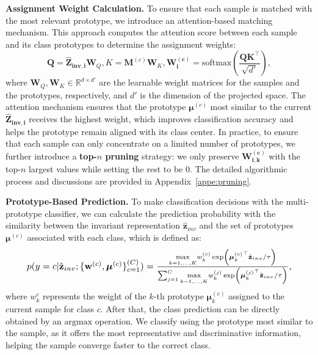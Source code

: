 \noindent\textbf{Assignment Weight Calculation.} 
To ensure that each sample is matched with the most relevant prototype, we introduce an attention-based matching mechanism. This approach computes the attention score between each sample and its class prototypes to determine the assignment weights:
\begin{equation}\label{eq: att}
    \mathbf{Q} = \mathbf{\hat{Z}_{inv,i}}\mathbf{W}_{Q}, K = \mathbf{M}^{(c)}\mathbf{W}_{K}, \mathbf{W^{(c)}_i} = \mathrm{softmax}(\frac{\mathbf{Q}\mathbf{K}^\top}{\sqrt{d'}}),
\end{equation}
where $\mathbf{W}_{Q}, \mathbf{W}_{K} \in \mathbb{R}^{d \times {d'}}$ are the learnable weight matrices for the samples and the prototypes, respectively, and $d'$ is the dimension of the projected space. The attention mechanism ensures that the prototype $\boldsymbol{\mu}^{(c)}$ most similar to the current $\mathbf{\hat{Z}_{inv,i}}$ receives the highest weight, which improves classification accuracy and helps the prototype remain aligned with its class center. In practice, to ensure that each sample can only concentrate on a limited number of prototypes, we further introduce a \textbf{top-$n$ pruning} strategy: we only preserve $\mathbf{W_{i,k}^{(c)}}$ with the top-$n$ largest values while setting the rest to be 0. The detailed algorithmic process and discussions are provided in Appendix~\ref{appe:pruning}. 

\noindent\textbf{Prototype-Based Prediction.} 
To make classification decisions with the multi-prototype classifier, we can calculate the prediction probability with the similarity between the invariant representation $\hat{\mathbf{z}}_{inv}$ and the set of prototypes $\boldsymbol{\mu}^{(c)}$ associated with each class, which is defined as:
\begin{align}\label{classify}
\resizebox{.9\hsize}{!}{$
p(y = c | \hat{\mathbf{z}}_{inv}; \{ \mathbf{w}^{(c)}, \boldsymbol{\mu}^{(c)}\}_{c=1}^{(C)}) = 
\frac{\underset {k=1,\dots,K}{\max} w_{k}^{(c)} \exp \left(  {\boldsymbol{\mu}_{k}^{(c)}}^\top \hat{\mathbf{z}}_{inv} / \tau \right)}
{\sum_{j=1}^{C} \underset {{k}=1,\dots,K}{\max} w_{k}^{(j)} \exp \left(  {\boldsymbol{\mu}_{k}^{(j)}}^\top \hat{\mathbf{z}}_{inv} / \tau \right)},$}
\end{align}
{where  $w_{k}^{c}$ represents the weight of the $k$-th prototype $\boldsymbol{\mu}_{k}^{(c)}$ assigned to the current sample for class $c$.}
After that, the class prediction can be directly obtained by an $\mathrm{argmax}$ operation. We classify using the prototype most similar to the sample, as it offers the most representative and discriminative information, helping the sample converge faster to the correct class.

